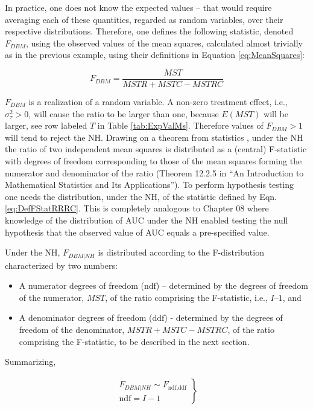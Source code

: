 \documentclass[
]{book}
\providecommand{\tightlist}{%
  \setlength{\itemsep}{0pt}\setlength{\parskip}{0pt}}
\begin{document}
In practice, one does not know the expected values -- that would require averaging each of these quantities, regarded as random variables, over their respective distributions. Therefore, one defines the following statistic, denoted \(F_{DBM}\), using the observed values of the mean squares, calculated almost trivially as in the previous example, using their definitions in Equation \eqref{eq:MeanSquares}:

\begin{equation}
F_{DBM} = \frac{MST}{MSTR + MSTC - MSTRC}
\label{eq:DefFStatRRRC}
\end{equation}

\(F_{DBM}\) is a realization of a random variable. A non-zero treatment effect, i.e., \(\sigma_{\tau}^{2} > 0\), will cause the ratio to be larger than one, because \(E\left ( MST \right)\) will be larger, see row labeled \(T\) in Table \ref{tab:ExpValMs}. Therefore values of \(F_{DBM} > 1\) will tend to reject the NH. Drawing on a theorem from statistics \citep{RN1492}, under the NH the ratio of two independent mean squares is distributed as a (central) F-statistic with degrees of freedom corresponding to those of the mean squares forming the numerator and denominator of the ratio (Theorem 12.2.5 in ``An Introduction to Mathematical Statistics and Its Applications''). To perform hypothesis testing one needs the distribution, under the NH, of the statistic defined by Eqn. \eqref{eq:DefFStatRRRC}. This is completely analogous to Chapter 08 where knowledge of the distribution of AUC under the NH enabled testing the null hypothesis that the observed value of AUC equals a pre-specified value.

Under the NH, \(F_{DBM|NH}\) is distributed according to the F-distribution characterized by two numbers:

\begin{itemize}
\tightlist
\item
  A numerator degrees of freedom (\(\text{ndf}\)) -- determined by the degrees of freedom of the numerator, \(MST\), of the ratio comprising the F-statistic, i.e., \(I – 1\), and
\item
  A denominator degrees of freedom (\(\text{ddf}\)) - determined by the degrees of freedom of the denominator, \(MSTR + MSTC - MSTRC\), of the ratio comprising the F-statistic, to be described in the next section.
\end{itemize}

Summarizing,

\begin{align}
\left.\begin{array}{rll}
F_{DBM|NH} \sim F_{\text{ndf},\text{ddf}} \\
\text{ndf}=I-1
\end{array}\right\}
\label{eq:NhDistrDBMDefFStatRRRC}
\end{align}
\end{document}
